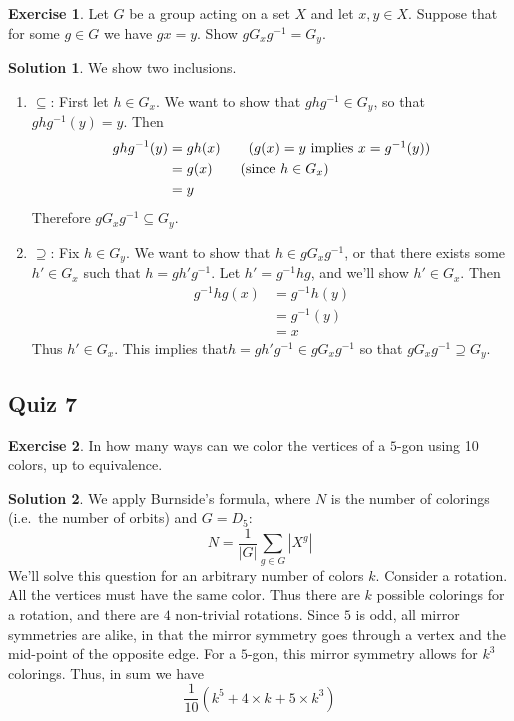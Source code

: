 \documentclass[12pt]{article}
\theoremstyle{definition}
\newtheorem{exercise}{\color{YellowOrange}Exercise}
\theoremstyle{definition}
\newtheorem{solution}{\color{Goldenrod}Solution}
\begin{document}
\begin{exercise}
	Let $G$ be a group acting on a set $X$ and let $x,y \in X$. Suppose that for some $g \in G$ we have $gx = y$. Show $gG_xg^{-1} = G_y$.
\end{exercise}
\begin{solution}
	We show two inclusions.
	\begin{enumerate}
		\item $\subseteq$: First let $h \in G_x$. We want to show that $ghg^{-1} \in G_y$, so that $ghg^{-1}(y) = y$.  Then
		\begin{align*}
			ghg^{-1}(y) &= gh(x) \tag{$g(x) = y$ implies $x = g^{-1}(y)$} \\
			&= g(x) \tag{since $h \in G_x$} \\
			&= y 
		\end{align*}
		Therefore $gG_xg^{-1} \subseteq G_y$.
		\item $\supseteq$: Fix $h \in G_y$. We want to show that $h \in gG_xg^{-1}$, or that there exists some $h' \in G_x$ such that $h = gh'g^{-1}$. Let $h' = g^{-1}hg$, and we'll show $h' \in G_x$. Then
		\begin{align*}
			g^{-1}hg(x) &= g^{-1}h(y) \\
			&= g^{-1}(y) \tag{since $h \in G_y$} \\
			&= x
		\end{align*}
		Thus $h' \in G_x$. This implies that$h = gh'g^{-1} \in gG_xg^{-1}$ so that $gG_xg^{-1} \supseteq G_y$. 
	\end{enumerate}
\end{solution}

\subsection{Quiz 7}
\begin{exercise}
	In how many ways can we color the vertices of a $5$-gon using 10 colors, up to equivalence. 
\end{exercise}
\begin{solution}
	We apply Burnside's formula, where $N$ is the number of colorings (i.e.\ the number of orbits) and $G = D_5$:
	\begin{equation}
		N = \frac{1}{|G|} \sum_{g\in G} |X^g|
	\end{equation}
	We'll solve this question for an arbitrary number of colors $k$. Consider a rotation. All the vertices must have the same color. Thus there are $k$ possible colorings for a rotation, and there are $4$ non-trivial rotations. Since $5$ is odd, all mirror symmetries are alike, in that the mirror symmetry goes through a vertex and the mid-point of the opposite edge. For a $5$-gon, this mirror symmetry allows for $k^3$ colorings. Thus, in sum we have
	\begin{equation}
		\frac{1}{10}(k^5 + 4 \times k + 5 \times k^3)
	\end{equation}
\end{solution}
\end{document}
